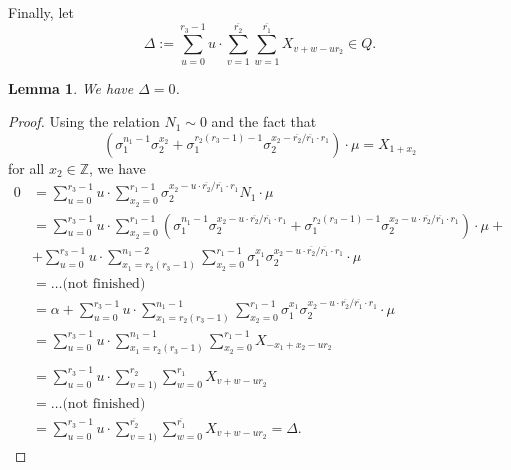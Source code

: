 \documentclass[12pt,a4paper]{article}
\newtheorem{lemma}[theorem]{Lemma}
\theoremstyle{definition}
\newcommand{\Z}{\mathbb{Z}}
\newcommand{\uo}{\overline{r_2}}
\newcommand{\vo}{\overline{r_1}}
\begin{document}
Finally, let $$\Delta:=\sum_{u=0}^{r_3-1}u\cdot\sum_{v=1}^{\uo} \sum _{w=1}^{\vo} X_{v+w-ur_2}\in Q.$$

\begin{lemma}
We have $\Delta=0$.
\end{lemma}
\begin{proof}
Using the relation $N_1\sim 0$ and the fact that $$(\sigma_1^{n_1-1}\sigma_2^{x_2}+\sigma_1^{r_2(r_3-1)-1}\sigma_2^{x_2-\uo/\vo\cdot r_1})\cdot \mu=X_{1+x_2}$$ for all $x_2\in\Z$, we have 
\begin{align*}
0&= \sum_{u=0}^{r_3-1}u\cdot \sum _{x_2=0}^{r_1-1}\sigma_2^{x_2-u\cdot \uo/\vo\cdot r_1}N_1\cdot \mu\\
&=\sum_{u=0}^{r_3-1}u\cdot \sum _{x_2=0}^{r_1-1} \left( \sigma_1^{n_1-1}\sigma_2^{x_2-u\cdot\uo/\vo\cdot r_1}+\sigma_1^{r_2(r_3-1)-1}\sigma_2^{x_2-u\cdot\uo/\vo\cdot r_1}\right)\cdot \mu+\\
&+\sum_{u=0}^{r_3-1}u\cdot \sum_{x_1=r_2(r_3-1)}^{n_1-2}\sum _{x_2=0}^{r_1-1}\sigma_1^{x_1}\sigma_2^{x_2-u\cdot \uo/\vo\cdot r_1}\cdot \mu\\
&=\dots \text{(not finished)}\\
&=\alpha+\sum_{u=0}^{r_3-1}u\cdot \sum_{x_1=r_2(r_3-1)}^{n_1-1}\sum _{x_2=0}^{r_1-1}\sigma_1^{x_1}\sigma_2^{x_2-u\cdot \uo/\vo\cdot r_1}\cdot \mu\\
&=\sum_{u=0}^{r_3-1}u\cdot \sum_{x_1=r_2(r_3-1)}^{n_1-1}\sum _{x_2=0}^{r_1-1}X_{-x_1+x_2-ur_2}\\\\
&=\sum_{u=0}^{r_3-1}u\cdot \sum_{v=1)}^{r_2}\sum _{w=0}^{r_1}X_{v+w-ur_2}\\
&=\dots \text{(not finished)}\\
&=\sum_{u=0}^{r_3-1}u\cdot \sum_{v=1)}^{\uo}\sum _{w=0}^{\vo}X_{v+w-ur_2}=\Delta.
\end{align*}
\end{proof}
\end{document}
